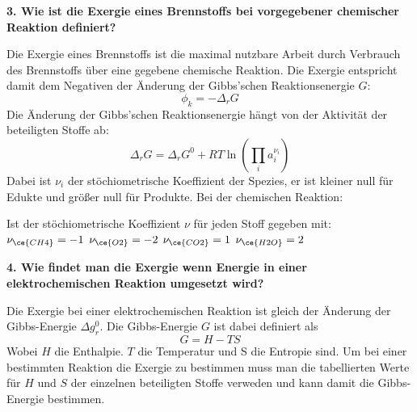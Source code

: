 \noindent\textbf{3. Wie ist die Exergie eines Brennstoffs bei vorgegebener chemischer Reaktion definiert? }\\
\begin{addmargin}[25pt]{0pt}
Die Exergie eines Brennstoffs ist die maximal nutzbare Arbeit durch Verbrauch des Brennstoffs über eine gegebene chemische Reaktion. Die Exergie entspricht damit dem Negativen der Änderung der Gibbs'schen Reaktionsenergie $G$:
\begin{equation}\label{eq:Exergie_chemische_Reaktion}
    \phi_k = -\Delta_rG
\end{equation}
Die Änderung der Gibbs'schen Reaktionsenergie hängt von der Aktivität der beteiligten Stoffe ab:
\begin{equation}\label{eq:Gibbs_Energie_activity}
    \Delta_rG = \Delta_rG^0 + RT \ln \left( \prod\limits_i a_i^{\nu_i}\right)
\end{equation}
Dabei ist $\nu_i$ der stöchiometrische Koeffizient der Spezies, er ist kleiner null für Edukte und größer null für Produkte. Bei der chemischen Reaktion:\\ 
\begin{center}
    \begin{large}
    \end{large}
\end{center}
Ist der stöchiometrische Koeffizient $\nu$ für jeden Stoff gegeben mit:\\
$\nu_{\ce{CH4}} = -1$ \hspace{2cm} $\nu_{\ce{O2}} = -2$ \hspace{2cm} $\nu_{\ce{CO2}} = 1$ \hspace{2cm} $\nu_{\ce{H2O}} = 2$  \\
\end{addmargin}


\noindent\textbf{4. Wie findet man die Exergie wenn Energie in einer elektrochemischen Reaktion umgesetzt wird?}\\
\begin{addmargin}[25pt]{0pt}
Die Exergie bei einer elektrochemischen Reaktion ist gleich der Änderung der Gibbs-Energie $\Delta g_r^0$. Die Gibbs-Energie $G$ ist dabei definiert als 
\begin{equation}\label{eq:definition_Gibbs_Energie}
    G = H - TS
\end{equation}
Wobei $H$ die Enthalpie. $T$ die Temperatur und S die Entropie sind. Um bei einer bestimmten Reaktion die Exergie zu bestimmen muss man die tabellierten Werte für $H$ und $S$ der einzelnen beteiligten Stoffe verweden und kann damit die Gibbs-Energie bestimmen.\\
\end{addmargin}

